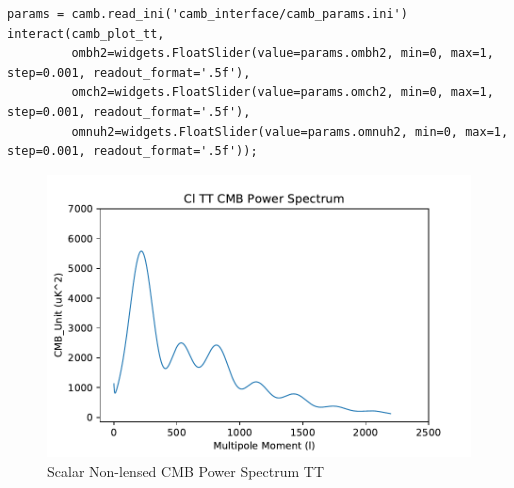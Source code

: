 \documentclass[twoside, fontsize=12pt,
     bibliography=totoc, %
     listof=totoc, %
     index=totoc, %
     onehalfspacing %
]{_MScDiss2017_cls}
\begin{document}
\begin{lstlisting}[caption={Creating the first plot}, captionpos=b]
params = camb.read_ini('camb_interface/camb_params.ini')
interact(camb_plot_tt,
         ombh2=widgets.FloatSlider(value=params.ombh2, min=0, max=1, step=0.001, readout_format='.5f'),
         omch2=widgets.FloatSlider(value=params.omch2, min=0, max=1, step=0.001, readout_format='.5f'),
         omnuh2=widgets.FloatSlider(value=params.omnuh2, min=0, max=1, step=0.001, readout_format='.5f'));
\end{lstlisting}

\label{sec:template}

\begin{figure}[t]
  \begin{center}
  \includegraphics{Cl-TT-vs-l.pdf}
  \caption{Scalar Non-lensed CMB Power Spectrum TT} 
  \label{fig:test}
  \end{center}
\end{figure}

\begin{singlespace}%
    
\end{singlespace}
\end{document}
